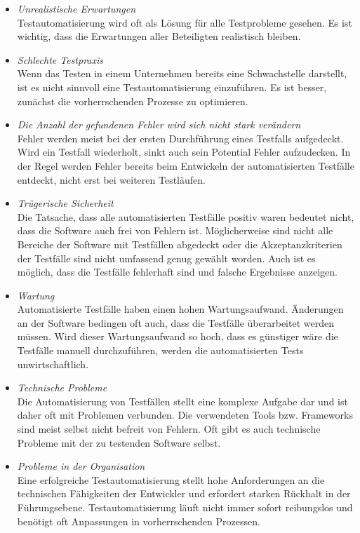 \begin{itemize}
\item \textit{Unrealistische Erwartungen} \\
Testautomatisierung wird oft als Lösung für alle Testprobleme gesehen. Es ist wichtig, dass die Erwartungen aller Beteiligten realistisch bleiben.
\item \textit{Schlechte Testpraxis } \\
Wenn das Testen in einem Unternehmen bereits eine Schwachstelle darstellt, ist es nicht sinnvoll eine Testautomatisierung einzuführen. Es ist besser, zunächst die vorherrschenden Prozesse zu optimieren.
\item \textit{Die Anzahl der gefundenen Fehler wird sich nicht stark verändern } \\
Fehler werden meist bei der ersten Durchführung eines Testfalls aufgedeckt. Wird ein Testfall wiederholt, sinkt auch sein Potential Fehler aufzudecken. In der Regel werden Fehler bereits beim Entwickeln der automatisierten Testfälle entdeckt, nicht erst bei weiteren Testläufen.
\item \textit{Trügerische Sicherheit} \\
Die Tatsache, dass alle automatisierten Testfälle positiv waren bedeutet nicht, dass die Software auch frei von Fehlern ist. Möglicherweise sind nicht alle Bereiche der Software mit Testfällen abgedeckt oder die Akzeptanzkriterien der Testfälle sind nicht umfassend genug gewählt worden. Auch ist es möglich, dass die Testfälle fehlerhaft sind und falsche Ergebnisse anzeigen.
\item \textit{Wartung} \\
 Automatisierte Testfälle haben einen hohen Wartungsaufwand. Änderungen an der Software bedingen oft auch, dass die Testfälle überarbeitet werden müssen. Wird dieser Wartungsaufwand so hoch, dass es günstiger wäre die Testfälle manuell durchzuführen, werden die automatisierten Tests unwirtschaftlich.
\item \textit{Technische Probleme} \\
Die Automatisierung von Testfällen stellt eine komplexe Aufgabe dar und ist daher oft mit Problemen verbunden. Die verwendeten Tools bzw. Frameworks sind meist selbst nicht befreit von Fehlern. Oft gibt es auch technische Probleme mit der zu testenden Software selbst.
\item \textit{Probleme in der Organisation} \\
Eine erfolgreiche Testautomatisierung stellt hohe Anforderungen an die technischen Fähigkeiten der Entwickler und erfordert starken Rückhalt in der Führungsebene. Testautomatisierung läuft nicht immer sofort reibungslos und benötigt oft Anpassungen in vorherrschenden Prozessen.
\end{itemize}


